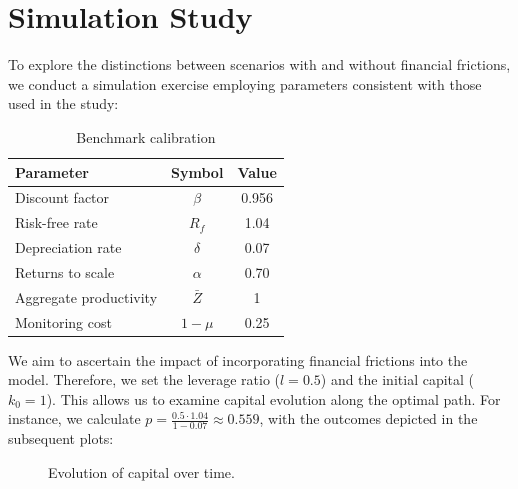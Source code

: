 \documentclass[12pt]{report}
\begin{document}
\section{Simulation Study}

To explore the distinctions between scenarios with and without financial frictions, we conduct a simulation exercise
employing  parameters consistent with those used in the \cite{OsePap17} study:

\begin{table}[H]
    \centering
    \begin{tabular}{lcc}
    \hline Parameter & Symbol & Value \\
    \hline \hline
    Discount factor & $\beta$ & 0.956 \\
    Risk-free rate & $R_f$ & 1.04 \\
    Depreciation rate & $\delta$ & 0.07 \\
    Returns to scale & $\alpha$ & 0.70 \\
    Aggregate productivity & $\bar{Z}$ & 1 \\
    Monitoring cost & $1-\mu$ & 0.25 \\
    \hline
    \end{tabular}
    \caption{Benchmark calibration}
\end{table}

We aim to ascertain the impact of incorporating financial frictions into the model. Therefore, we set the leverage
ratio (\(l=0.5\))  and the initial capital (\(k_0=1\)). This allows us to examine capital evolution along the optimal
path. For instance, we calculate \(p=\frac{0.5 \cdot 1.04}{1-0.07} \approx 0.559\), with the outcomes depicted in the
subsequent plots:

\begin{figure}[H]
    \centering
    \caption{Evolution of capital over time.}
    \label{fig:capitalEvolution}
\end{figure}
\end{document}

